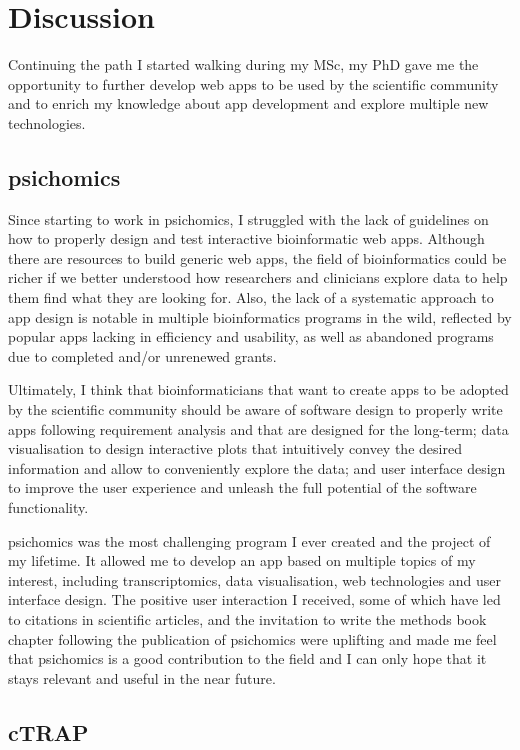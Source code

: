 \chapter{Discussion}

Continuing the path I started walking during my MSc, my PhD gave me the opportunity to further develop web apps to be used by the scientific community and to enrich my knowledge about app development and explore multiple new technologies.

\section{psichomics}

Since starting to work in psichomics, I struggled with the lack of guidelines on how to properly design and test interactive bioinformatic web apps. Although there are resources to build generic web apps, the field of bioinformatics could be richer if we better understood how researchers and clinicians explore data to help them find what they are looking for. Also, the lack of a systematic approach to app design is notable in multiple bioinformatics programs in the wild, reflected by popular apps lacking in efficiency and usability, as well as abandoned programs due to completed and/or unrenewed grants.

Ultimately, I think that bioinformaticians that want to create apps to be adopted by the scientific community should be aware of software design to properly write apps following requirement analysis and that are designed for the long-term; data visualisation to design interactive plots that intuitively convey the desired information and allow to conveniently explore the data; and user interface design to improve the user experience and unleash the full potential of the software functionality.

psichomics was the most challenging program I ever created and the project of my lifetime. It allowed me to develop an app based on multiple topics of my interest, including transcriptomics, data visualisation, web technologies and user interface design. The positive user interaction I received, some of which have led to citations in scientific articles, and the invitation to write the methods book chapter following the publication of psichomics were uplifting and made me feel that psichomics is a good contribution to the field and I can only hope that it stays relevant and useful in the near future.

\section{cTRAP}

